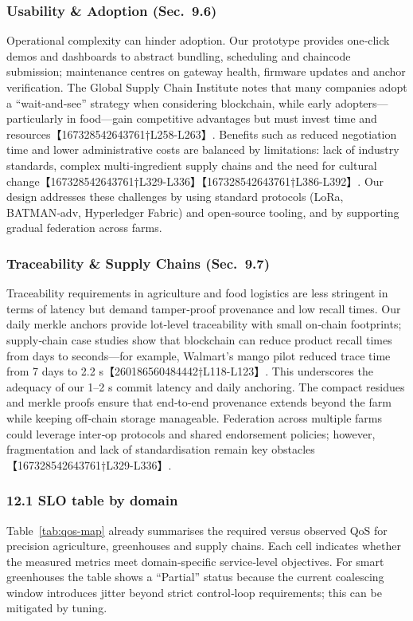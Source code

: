 \subsubsection{Usability \& Adoption (Sec.~9.6)}
Operational complexity can hinder adoption.  Our prototype provides one‑click demos and dashboards to abstract bundling, scheduling and chaincode submission; maintenance centres on gateway health, firmware updates and anchor verification.  The Global Supply Chain Institute notes that many companies adopt a ``wait‑and‑see'' strategy when considering blockchain, while early adopters—particularly in food—gain competitive advantages but must invest time and resources【167328542643761†L258-L263】.  Benefits such as reduced negotiation time and lower administrative costs are balanced by limitations: lack of industry standards, complex multi‑ingredient supply chains and the need for cultural change【167328542643761†L329-L336】【167328542643761†L386-L392】.  Our design addresses these challenges by using standard protocols (LoRa, BATMAN‑adv, Hyperledger Fabric) and open‑source tooling, and by supporting gradual federation across farms.

\subsubsection{Traceability \& Supply Chains (Sec.~9.7)}
Traceability requirements in agriculture and food logistics are less stringent in terms of latency but demand tamper‑proof provenance and low recall times.  Our daily merkle anchors provide lot‑level traceability with small on‑chain footprints; supply‑chain case studies show that blockchain can reduce product recall times from days to seconds—for example, Walmart’s mango pilot reduced trace time from 7 days to 2.2 s【260186560484442†L118-L123】.  This underscores the adequacy of our 1–2 s commit latency and daily anchoring.  The compact residues and merkle proofs ensure that end‑to‑end provenance extends beyond the farm while keeping off‑chain storage manageable.  Federation across multiple farms could leverage inter‑op protocols and shared endorsement policies; however, fragmentation and lack of standardisation remain key obstacles【167328542643761†L329-L336】.

\subsubsection*{12.1 SLO table by domain}
Table~\ref{tab:qos-map} already summarises the required versus observed QoS for precision agriculture, greenhouses and supply chains.  Each cell indicates whether the measured metrics meet domain‑specific service‑level objectives.  For smart greenhouses the table shows a ``Partial'' status because the current coalescing window introduces jitter beyond strict control‑loop requirements; this can be mitigated by tuning.

